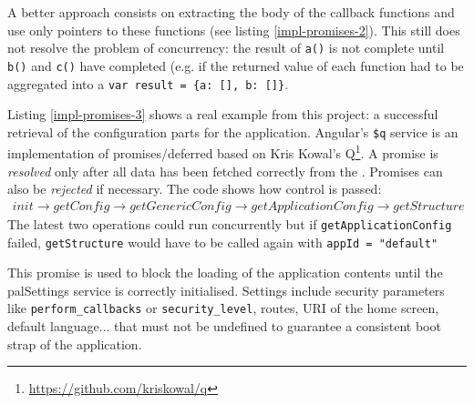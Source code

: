 

A better approach consists on extracting the body of the callback functions and use only pointers to these functions (see listing \ref{impl-promises-2}).
This still does not resolve the problem of concurrency: the result of \texttt{a()} is not complete until \texttt{b()} and \texttt{c()} have completed (e.g. if the returned value of each function had to be aggregated into a \lstinline$var result = {a: [], b: []}$. 



Listing \ref{impl-promises-3} shows a real example from this project: a successful retrieval of the configuration parts for the application.
Angular's \texttt{\$q} service is an implementation of promises/deferred based on Kris Kowal's Q\footnote{\url{https://github.com/kriskowal/q}}.
A promise is \emph{resolved} only after all data has been fetched correctly from the \flangobe .
Promises can also be \emph{rejected} if necessary.
The code shows how control is passed: 
\begin{eqnarray}
init \rightarrow getConfig \rightarrow getGenericConfig \rightarrow getApplicationConfig \rightarrow getStructure \nonumber
\end{eqnarray}
The latest two operations could run concurrently but if \texttt{getApplicationConfig} failed, \texttt{getStructure} would have to be called again with \texttt{appId = "default"}

This promise is used to block the loading of the application contents until the palSettings service is correctly initialised.
Settings include security parameters like \texttt{perform\_callbacks} or \texttt{security\_level}, routes, \ac{URI} of the home screen, default language... that must not be undefined to guarantee a consistent boot strap of the application.

